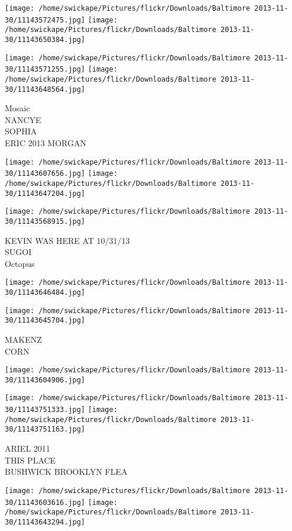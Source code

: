 \documentclass[10pt,letterpaper]{article}
\begin{document}
\texttt{[image: /home/swickape/Pictures/flickr/Downloads/Baltimore 2013-11-30/11143572475.jpg]}
\texttt{[image: /home/swickape/Pictures/flickr/Downloads/Baltimore 2013-11-30/11143650384.jpg]}

\texttt{[image: /home/swickape/Pictures/flickr/Downloads/Baltimore 2013-11-30/11143571255.jpg]}
\texttt{[image: /home/swickape/Pictures/flickr/Downloads/Baltimore 2013-11-30/11143648564.jpg]}

Mosaic\\
NANCYE\\
SOPHIA\\
ERIC 2013 MORGAN
\pagebreak

\texttt{[image: /home/swickape/Pictures/flickr/Downloads/Baltimore 2013-11-30/11143607656.jpg]}
\texttt{[image: /home/swickape/Pictures/flickr/Downloads/Baltimore 2013-11-30/11143647204.jpg]}

\texttt{[image: /home/swickape/Pictures/flickr/Downloads/Baltimore 2013-11-30/11143568915.jpg]}

KEVIN WAS HERE AT 10/31/13\\
SUGOI\\
Octopus
\pagebreak

\texttt{[image: /home/swickape/Pictures/flickr/Downloads/Baltimore 2013-11-30/11143646484.jpg]}

\vspace{0.25in}
\texttt{[image: /home/swickape/Pictures/flickr/Downloads/Baltimore 2013-11-30/11143645704.jpg]}

MAKENZ\\
CORN
\pagebreak

\texttt{[image: /home/swickape/Pictures/flickr/Downloads/Baltimore 2013-11-30/11143604906.jpg]}

\vspace{0.25in}
\texttt{[image: /home/swickape/Pictures/flickr/Downloads/Baltimore 2013-11-30/11143751333.jpg]}
\texttt{[image: /home/swickape/Pictures/flickr/Downloads/Baltimore 2013-11-30/11143751163.jpg]}

ARIEL 2011\\
THIS PLACE\\
BUSHWICK BROOKLYN FLEA
\pagebreak

\texttt{[image: /home/swickape/Pictures/flickr/Downloads/Baltimore 2013-11-30/11143603616.jpg]}
\texttt{[image: /home/swickape/Pictures/flickr/Downloads/Baltimore 2013-11-30/11143643294.jpg]}
\end{document}
